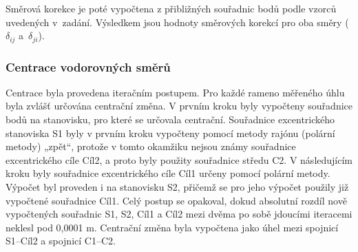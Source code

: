 Směrová korekce je poté vypočtena z přibližných souřadnic bodů podle vzorců uvedených v~zadání. Výsledkem jsou hodnoty směrových korekcí pro oba směry ($\delta_{ij}$ a~$\delta_{ji}$).


\subsubsection{Centrace vodorovných směrů}



\tab Centrace byla provedena iteračním postupem. Pro každé rameno měřeného úhlu byla zvlášť určována centrační změna. V prvním kroku byly vypočteny souřadnice bodů na stanovisku, pro které se určovala centrační. Souřadnice excentrického stanoviska S1 byly v prvním kroku vypočteny pomocí metody rajónu (polární metody) „zpět“, protože v tomto okamžiku nejsou známy souřadnice excentrického cíle Cíl2, a proto byly použity souřadnice středu C2. V následujícím kroku byly souřadnice excentrického cíle Cíl1 určeny pomocí polární metody. Výpočet byl proveden i na stanovisku S2, přičemž se pro jeho výpočet použily již vypočtené souřadnice Cíl1. Celý postup se opakoval, dokud absolutní rozdíl nově vypočtených souřadnic S1, S2, Cíl1 a Cíl2 mezi dvěma po sobě jdoucími iteracemi neklesl pod 0,0001 m. Centrační změna byla vypočtena jako úhel mezi spojnicí S1–Cíl2 a spojnicí C1–C2.

